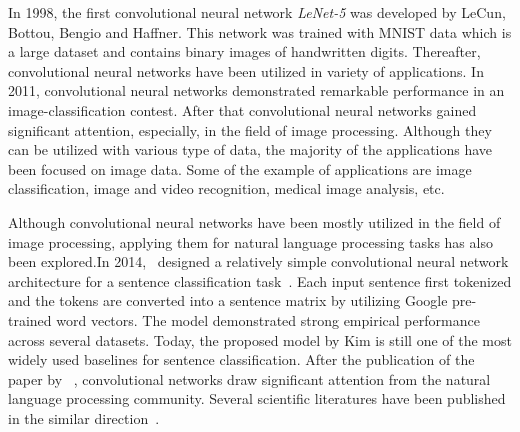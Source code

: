 In 1998, the first convolutional neural network \textit{LeNet-5} was developed by LeCun, Bottou, Bengio and Haffner. This network was trained with MNIST data which is a large dataset and contains binary images of handwritten digits. Thereafter, convolutional neural networks have been utilized in variety of applications. In 2011, convolutional neural networks demonstrated remarkable performance in an image-classification contest. After that convolutional neural networks gained significant attention, especially, in the field of image processing. Although they can be utilized with various type of data, the majority of the applications have been focused on image data. Some of the example of applications are image classification, image and video recognition, medical image analysis, etc.

Although convolutional neural networks have been mostly utilized in the field of image processing, applying them for natural language processing tasks has also been  explored.In 2014,~\citeauthor{DBLP:conf/emnlp/Kim14} designed a relatively simple convolutional neural network architecture for a sentence classification task~\cite{DBLP:conf/emnlp/Kim14}. Each input sentence first tokenized and the tokens are converted into a sentence matrix by utilizing Google pre-trained word vectors. The model demonstrated strong empirical performance across several datasets. Today, the proposed model by Kim is still one of the most widely used baselines for sentence classification. After the publication of the paper by ~\cite{DBLP:conf/emnlp/Kim14}, convolutional networks draw significant attention from the natural language processing community. Several scientific literatures have been published in the similar direction~\cite{}.


